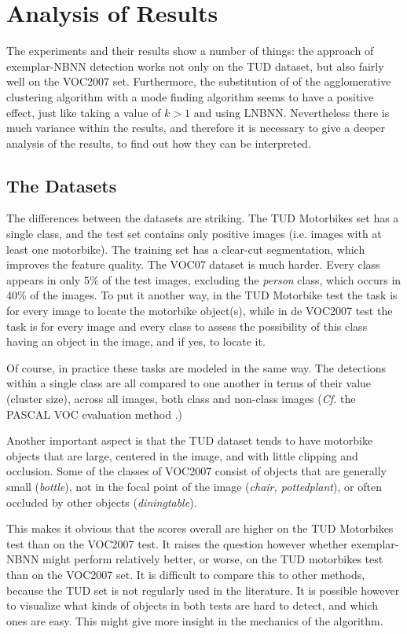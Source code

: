 \section{Analysis of Results} %
\label{cha:analysis_of_results}

The experiments and their results show a number of things: the approach of exemplar-NBNN detection works not only on the TUD dataset, but also fairly well on the VOC2007 set. Furthermore, the substitution of of the agglomerative clustering algorithm with a mode finding algorithm seems to have a positive effect, just like taking a value of $k>1$ and using LNBNN. Nevertheless there is much variance within the results, and therefore it is necessary to give a deeper analysis of the results, to find out how they can be interpreted.

\subsection{The Datasets} %
\label{sec:the_dataset}

The differences between the datasets are striking. The TUD Motorbikes set has a single class, and the test set contains only positive images (i.e. images with at least one motorbike). The training set has a clear-cut segmentation, which improves the feature quality. The VOC07 dataset is much harder. Every class appears in only 5\% of the test images, excluding the \emph{person} class, which occurs in 40\% of the images. To put it another way, in the TUD Motorbike test the task is for every image to locate the motorbike object(s), while in de VOC2007 test the task is for every image and every class to assess the possibility of this class having an object in the image, and if yes, to locate it.

Of course, in practice these tasks are modeled in the same way. The detections within a single class are all compared to one another in terms of their value (cluster size), across all images, both class and non-class images (\emph{Cf.} the PASCAL VOC evaluation method \cite{pascal-voc-2007}.)

Another important aspect is that the TUD dataset tends to have motorbike objects that are large, centered in the image, and with little clipping and occlusion. Some of the classes of VOC2007 consist of objects that are generally small (\emph{bottle}), not in the focal point of the image (\emph{chair, pottedplant}), or often occluded by other objects (\emph{diningtable}).

This makes it obvious that the scores overall are higher on the TUD Motorbikes test than on the VOC2007 test. It raises the question however whether exemplar-NBNN might perform relatively better, or worse, on the TUD motorbikes test than on the VOC2007 set. It is difficult to compare this to other methods, because the TUD set is not regularly used in the literature. It is possible however to visualize what kinds of objects in both tests are hard to detect, and which ones are easy. This might give more insight in the mechanics of the algorithm.

